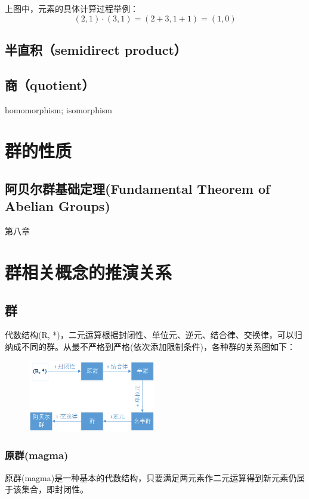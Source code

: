 \documentclass[12pt]{article}
\begin{document}
上图中，元素的具体计算过程举例：
$$
(2, 1) \cdot (3, 1)  = (2 + 3, 1 + 1) = (1, 0)
$$



\subsection{半直积（semidirect product）}
\subsection{商（quotient）}

homomorphism; isomorphism

\section{群的性质}

\subsection{阿贝尔群基础定理(Fundamental Theorem of Abelian Groups)}
第八章

\section{群相关概念的推演关系\cite{Introduction_Of_Algebra_Structure}}
\subsection{群}
代数结构(R, *)，二元运算根据封闭性、单位元、逆元、结合律、交换律，可以归纳成不同的群。从最不严格到严格(依次添加限制条件)，各种群的关系图如下：
\begin{figure}[H]
    \centering
    \includegraphics[width=0.5\textwidth]{fig/GroupLikeRelations.png}
\end{figure}

\subsubsection{原群(magma)}
原群(magma)是一种基本的代数结构，只要满足两元素作二元运算得到新元素仍属于该集合，即封闭性。
\end{document}
